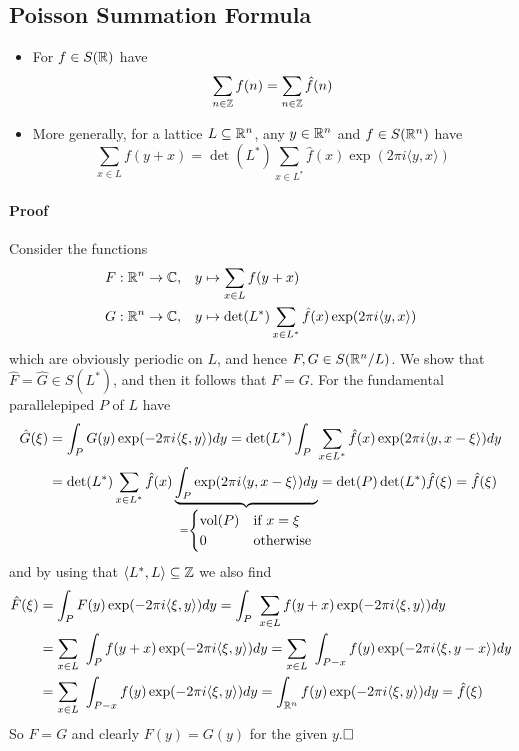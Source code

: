 \subsection{Poisson Summation Formula}
\begin{itemize}
    \item For $f \in S(\mathbb{R})$ have
    \begin{equation*}
        \sum_{n \in \mathbb{Z}} f(n) = \sum_{n \in \mathbb{Z}} \hat{f}(n)
    \end{equation*}
    \item More generally, for a lattice $L \subseteq \mathbb{R}^n$, any $y \in \mathbb{R}^n$ and $f \in S(\mathbb{R}^n)$ have
    \begin{equation*}
        \sum_{x \in L} f(y + x) = \det(L^*) \sum_{x \in L^*} \hat{f}(x) \exp(2\pi i \langle y, x \rangle)
    \end{equation*}
\end{itemize}
\paragraph{Proof} Consider the functions
\begin{align*}
    F: \mathbb{R}^n \to \mathbb{C}, \quad &y \mapsto \sum_{x \in L} f(y + x) \\
    G: \mathbb{R}^n \to \mathbb{C}, \quad &y \mapsto \det(L^*) \sum_{x \in L^*} \hat{f}(x)\exp(2\pi i\langle y, x \rangle)
\end{align*}
which are obviously periodic on $L$, and hence $F, G \in S(\mathbb{R}^n / L)$.
We show that $\hat{F} = \hat{G} \in S(L^*)$, and then it follows that $F = G$. For the fundamental parallelepiped $P$ of $L$ have
\begin{align*}
    \hat{G}(\xi) &= \int_P G(y) \exp(-2\pi i \langle \xi, y \rangle) dy = \det(L^*) \int_P \ \sum_{x \in L^*} \hat{f}(x) \exp(2\pi i \langle y, x - \xi \rangle) dy \\
    &= \det(L^*) \sum_{x \in L^*} \hat{f}(x) \underbrace{\int_P \exp(2\pi i \langle y, x - \xi \rangle) dy}_{= \begin{cases}
        \mathrm{vol}(P) & \text{if $x = \xi$} \\
        0 & \text{otherwise}
    \end{cases}} = \det(P)\det(L^*) \hat{f}(\xi) = \hat{f}(\xi)
\end{align*}
and by using that $\langle L^*, L \rangle \subseteq \mathbb{Z}$ we also find
\begin{align*}
    \hat{F}(\xi) &= \int_P F(y) \exp(-2\pi i \langle \xi, y \rangle) dy = \int_P \ \sum_{x \in L} f(y + x) \exp(-2\pi i \langle \xi, y \rangle) dy \\
    &= \sum_{x \in L} \ \int_P f(y + x) \exp(-2\pi i \langle \xi, y \rangle) dy = \sum_{x \in L} \ \int_{P - x} f(y) \exp(-2\pi i \langle \xi, y - x \rangle) dy \\
    &= \sum_{x \in L} \ \int_{P - x} f(y) \exp(-2\pi i \langle \xi, y \rangle) dy = \int_{\mathbb{R}^n} f(y)\exp(-2\pi i \langle \xi, y \rangle) dy = \hat{f}(\xi)
\end{align*}
So $F = G$ and clearly $F(y) = G(y)$ for the given $y$.$\hfill\square$


